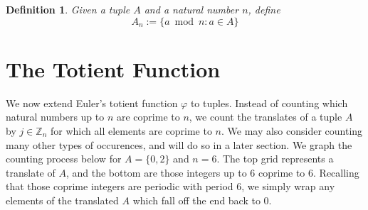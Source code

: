 \documentclass[11pt, leqno]{article}
\newtheorem{definition}[theorem]{Definition}
\begin{document}
\begin{definition}
Given a tuple $A$ and a natural number $n$, define
$$A_n := \{a \bmod n : a\in A\}$$
\end{definition}

\section{The Totient Function}

We now extend Euler's totient function $\varphi$ to tuples.
Instead of counting which natural numbers up to $n$ are 
coprime to $n$, we count the translates of a tuple $A$ by $j\in\mathbb{Z}_n$ 
for which all elements are coprime to $n$.
We may also consider counting many other types of occurences, and will do so
in a later section.
We graph the counting process below for $A=\{0,2\}$ and $n=6$.
The top grid represents a translate of $A$, and the bottom
are those integers up to 6 coprime to 6.
Recalling that those coprime integers are periodic with period 6,
we simply wrap any elements of the translated $A$ which fall
off the end back to 0.
\end{document}
